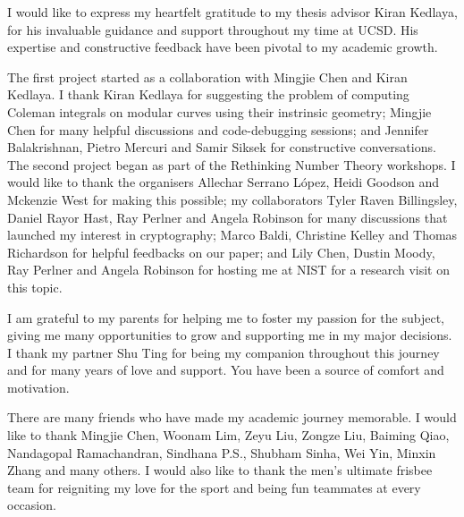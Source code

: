\begin{frontmatter}
%
\tableofcontents



%
%
\begin{acknowledgements}
I would like to express my heartfelt gratitude to my thesis advisor Kiran Kedlaya, for his invaluable guidance and support throughout my time at UCSD. His expertise and constructive feedback have been pivotal to my academic growth.

The first project started as a collaboration with Mingjie Chen and Kiran Kedlaya. I thank Kiran Kedlaya for suggesting the problem of computing Coleman integrals on modular curves using their instrinsic geometry; Mingjie Chen for many helpful discussions and code-debugging sessions; and Jennifer Balakrishnan, Pietro Mercuri and Samir Siksek for constructive conversations. The second project began as part of the Rethinking Number Theory workshops. I would like to thank the organisers Allechar Serrano López, Heidi Goodson and Mckenzie West for making this possible; my collaborators Tyler Raven Billingsley, Daniel Rayor Hast, Ray Perlner and Angela Robinson for many discussions that launched my interest in cryptography; Marco Baldi, Christine Kelley and Thomas Richardson for helpful feedbacks on our paper; and Lily Chen, Dustin Moody, Ray Perlner and Angela Robinson for hosting me at NIST for a research visit on this topic.

I am grateful to my parents for helping me to foster my passion for the subject, giving me many opportunities to grow and supporting me in my major decisions. I thank my partner Shu Ting for being my companion throughout this journey and for many years of love and support. You have been a source of comfort and motivation.

There are many friends who have made my academic journey memorable. I would like to thank Mingjie Chen, Woonam Lim, Zeyu Liu, Zongze Liu, Baiming Qiao, Nandagopal Ramachandran, Sindhana P.S., Shubham Sinha, Wei Yin, Minxin Zhang and many others. I would also like to thank the men's ultimate frisbee team for reigniting my love for the sport and being fun teammates at every occasion.


\end{acknowledgements}
\end{frontmatter}
